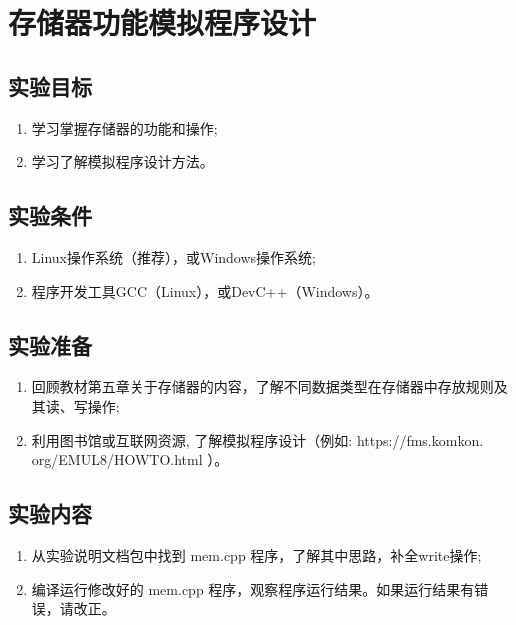 
\chapter{存储器功能模拟程序设计}

\section{实验目标}

\begin{enumerate}
	\item 学习掌握存储器的功能和操作;
	\item 学习了解模拟程序设计方法。
\end{enumerate}

\section{实验条件}

\begin{enumerate}
	\item Linux操作系统（推荐），或Windows操作系统;
	\item 程序开发工具GCC（Linux），或DevC++（Windows）。
\end{enumerate}

\section{实验准备}

\begin{enumerate}
	\item 回顾教材第五章关于存储器的内容，了解不同数据类型在存储器中存放规则及其读、写操作;
	\item 利用图书馆或互联网资源, 了解模拟程序设计（例如: https://fms.komkon.
		org/EMUL8/HOWTO.html ）。
\end{enumerate}

\section{实验内容}

\begin{enumerate}
	\item 从实验说明文档包中找到 mem.cpp 程序，了解其中思路，补全write操作;
	\item 编译运行修改好的 mem.cpp 程序，观察程序运行结果。如果运行结果有错误，请改正。
\end{enumerate}


